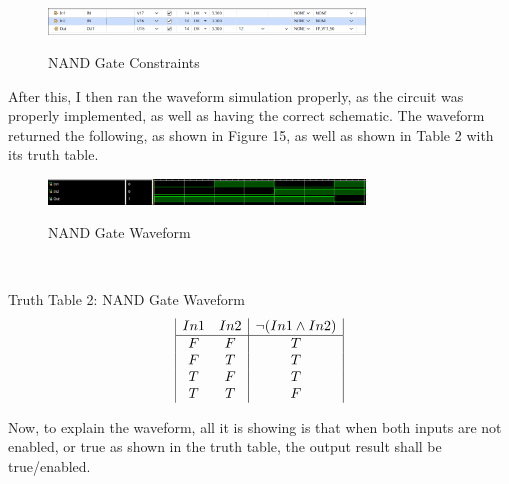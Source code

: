 \documentclass{article}
\begin{document}
\begin{figure}[!htbp]
    \centering
    \caption{NAND Gate Constraints}
    \includegraphics[width=0.75\textwidth]{NAND-GATE-CONSTRAINTS.png}
    \label{NAND Gate, Constrants}
\end{figure}\newpage
After this, I then ran the waveform simulation properly, as the circuit was properly implemented, as well as having the correct schematic. The waveform returned the following, as shown in Figure 15, as well as shown in Table 2 with its truth table.
\begin{figure}[!htbp]
    \centering
    \caption{NAND Gate Waveform}
    \includegraphics[width=0.75\textwidth]{NAND-GATE-WAVEFORM.png}
    \label{NAND Gate, Waveform}
\end{figure}\\
\begin{center}
    Truth Table 2: NAND Gate Waveform
    \begin{displaymath}
    \begin{array}{|c c|c|}
    In1 & In2 & \neg(In1 \land In2)\\
    \hline
    F & F & T\\
    F & T & T\\
    T & F & T\\
    T & T & F\\
    \end{array}
    \end{displaymath}
\end{center}
Now, to explain the waveform, all it is showing is that when both inputs are not enabled, or true as shown in the truth table, the output result shall be true/enabled.
\newpage
\end{document}
